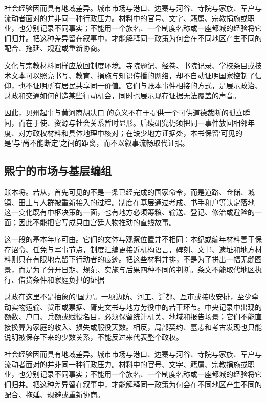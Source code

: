 社会经验因而具有地域差异。城市市场与港口、边寨与河谷、寺院与家族、军户与流动者面对的并非同一种行政压力。材料中的官号、文字、籍属、宗教捐施或职业，也分别记录不同事实；不能用一个族名、一个制度名称或一座都城的经验将它们归并。把这种差异留在叙事中，才能解释同一政策为何会在不同地区产生不同的配合、拖延、规避或重新协商。

文化与宗教材料同样应放回制度环境。寺院题记、经卷、书院记录、学校条目或技术文本可以照亮书写、教育、捐施与知识传播的网络，却不自动证明国家控制了信仰，也不证明所有居民共享同一价值。它们与账本事件相接的方式，是展示政治、财政和交通如何创造某些行动机会，同时也展示现存证据无法覆盖的声音。

因此，贝州起事与黄河商胡决口 的意义不在于提供一个可供道德裁断的孤立瞬间，而在于使、资源与社会关系暂时显形。后续研究仍须把同一事件放回相邻年度、对方政权材料和具体地理中核对；在缺少地方证据处，本书保留‘可见的是’与‘尚不能断定’之间的距离，而不以叙事流畅取代证据。

\subsection{熙宁的市场与基层编组}

账本将。若从，首先可见的不是一条已经完成的国家命令，而是道路、仓储、城镇、田土与人群被重新接入的过程。制度在基层通过考成、书手和户等认定落地 这一变化既有中枢决策的一面，也有地方必须筹粮、输送、登记、修治或避险的一面；因此不能把它写成只由宫廷人物推动的直线故事。

这一段的基本年序可由。它们的文体与观察位置并不相同：本纪或编年材料善于保存诏令、任免与军事节点，制度汇编更接近机构语言，碑刻、文书、遗址和地方材料则只在有限地点留下行动者的痕迹。把这些材料并排，不是为了拼出一幅无缝图景，而是为了分开日期、规范、实施与后果四种不同的判断。条文不能取代地区执行、借贷条件和家庭负担的证据

财政在这里不是抽象的‘国力’。一项边防、河工、迁都、互市或接收安排，至少牵动实物运输、货币或票据、胥吏文书与地方劳役中的若干环节。中央记录中出现的额数、户口、兵额或赋役名目，必须保留统计机关、地域和报告场景；它们不能直接换算为家庭的收入、损失或服役天数。相反，局部契约、墓志和考古发现也只能说明被保存下来的少数关系，不能反过来代表整个政权。

社会经验因而具有地域差异。城市市场与港口、边寨与河谷、寺院与家族、军户与流动者面对的并非同一种行政压力。材料中的官号、文字、籍属、宗教捐施或职业，也分别记录不同事实；不能用一个族名、一个制度名称或一座都城的经验将它们归并。把这种差异留在叙事中，才能解释同一政策为何会在不同地区产生不同的配合、拖延、规避或重新协商。

